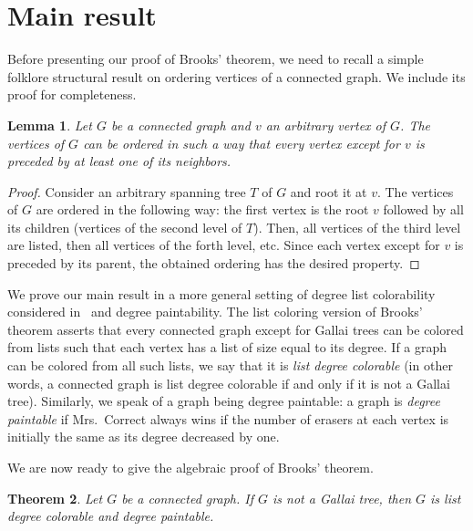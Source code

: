 \documentclass[10pt]{article}
\newtheorem{theorem}{Theorem}
\newtheorem{lemma}[theorem]{Lemma}
\begin{document}
\section{Main result}

Before presenting our proof of Brooks' theorem, we need to recall a simple
folklore structural result on ordering vertices of a connected graph. We include its
proof for completeness.

\begin{lemma}
\label{lm-dfs}
Let $G$ be a connected graph and $v$ an arbitrary vertex of $G$. The vertices of $G$
can be ordered in such a way that every vertex except for $v$ is preceded by at least
one of its neighbors.
\end{lemma}

\begin{proof}
Consider an arbitrary spanning tree $T$ of $G$ and root it at $v$. The vertices of $G$
are ordered in the following way: the first vertex is the root $v$ followed by all
its children (vertices of the second level of $T$). Then, all vertices of the third level
are listed, then all vertices of the forth level, etc. Since each vertex except for $v$
is preceded by its parent, the obtained ordering has the desired property.
\end{proof}

We prove our main result in a more general setting of degree list colorability
considered in~\cite{bib-borodin77,bib-erdos79+} and degree paintability.
The list coloring version of Brooks' theorem asserts that every connected graph except
for Gallai trees can be colored from lists such that each vertex has a list of size equal
to its degree. If a graph can be colored from all such lists, we say that it is {\em list
degree colorable} (in other words, a connected graph is list degree colorable if and only
if it is not a Gallai tree). Similarly, we speak of a graph being degree paintable:
a graph is {\em degree paintable} if Mrs.~Correct always wins if the number of erasers
at each vertex is initially the same as its degree decreased by one.

We are now ready to give the algebraic proof of Brooks' theorem.

\begin{theorem}
\label{thm-main}
Let $G$ be a connected graph. If $G$ is not a Gallai tree,
then $G$ is list degree colorable and degree paintable.
\end{theorem}
\end{document}

